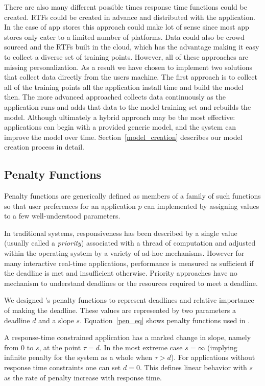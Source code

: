 There are also many different possible times response time functions could be created.  RTFs could be created in advance and distributed with the application. In the case of app stores this approach could make lot of sense since most app stores only cater to a limited number of platforms. Data could also be crowd sourced and the RTFs built in the cloud, which has the advantage making it easy to collect a diverse set of training points.  However, all of these approaches are missing personalization.  As a result we have chosen to implement two solutions that collect data directly from the users machine.  The first approach is to collect all of the training points all the application install time and build the model then.  The more advanced approached collects data continuously as the application runs and adds that data to the model training set and rebuilds the model.  Although ultimately a hybrid approach may be the most effective: applications can begin with a provided generic model, and the system can improve the model over time. Section~\ref{model_creation} describes our model creation process in detail.

\subsection*{Penalty Functions}

Penalty functions are generically defined as members of a family of such functions
so that user preferences for an application $p$ can implemented by assigning values to a few well-understood parameters.

In traditional systems, responsiveness has been described by a single value (usually called a \emph{priority}) associated with a thread of computation and adjusted within the operating system by a variety of ad-hoc mechanisms.  However for many interactive real-time applications, performance is measured as sufficient if the deadline is met and insufficient otherwise. Priority approaches have no mechanism to understand deadlines or the resources required to meet a deadline.

We designed \pacora's penalty functions to represent deadlines and relative importance of making the deadline.  These values are represented by two parameters a deadline $d$ and a slope $s$.  Equation~\ref{pen_eq} shows penalty functions used in \pacora.

A response-time constrained application has a marked change in slope, namely from 0 to $s$, at the point $\tau= d$. In the most extreme case $s = \infty$ (implying infinite penalty for the system as a whole when $\tau > d$).  For applications without response time constraints one can set $d = 0$. This defines linear behavior with $s$ as the rate of penalty increase with response time.

